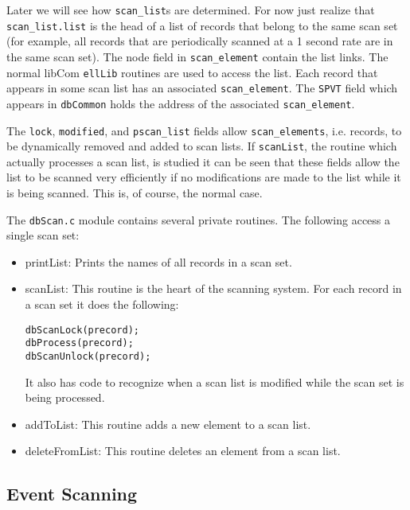 Later we will see how \verb|scan_list|s are determined. For now just realize that \verb|scan_list.list| is the head of a list of 
records that belong to the same scan set (for example, all records that are periodically scanned at a 1 second rate are in the 
same scan set). The node field in \verb|scan_element| contain the list links. The normal libCom \verb|ellLib| routines are used 
to access the list. Each record that appears in some scan list has an associated \verb|scan_element|. The \verb|SPVT| field which 
appears in \verb|dbCommon| holds the address of the associated \verb|scan_element|.

The \verb|lock|, \verb|modified|, and \verb|pscan_list| fields allow \verb|scan_elements|, i.e. records, to be dynamically removed and 
added to scan lists. If \verb|scanList|, the routine which actually processes a scan list, is studied it can be seen that these fields 
allow the list to be scanned very efficiently if no modifications are made to the list while it is being scanned. This is, of 
course, the normal case.

The \verb|dbScan.c| module contains several private routines. The following access a single scan set: 

\begin{itemize}
\item printList:  Prints the names of all records in a scan set.

\item scanList:  This routine is the heart of the scanning system. For each record in a scan set it does the following:

\begin{verbatim}
dbScanLock(precord);
dbProcess(precord);
dbScanUnlock(precord);
\end{verbatim}

It also has code to recognize when a scan list is modified while the scan set is being processed.

\item addToList:  This routine adds a new element to a scan list.

\item deleteFromList:  This routine deletes an element from a scan list.

\end{itemize}

\subsection{Event Scanning}


